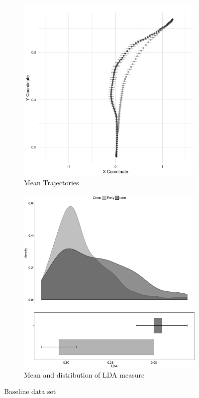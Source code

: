 \documentclass{article}
\begin{document}
\begin{figure}
\centering
\begin{subfigure}[b]{0.45\textwidth}
\includegraphics[width=\textwidth]{TrajectoriesBaseline.png}
\caption{Mean Trajectories}\label{fig:baseline-traj}
\end{subfigure}
\begin{subfigure}[b]{0.45\textwidth}
\includegraphics[width=\textwidth]{lda_distribution_baseline.png}
\caption{Mean and distribution of LDA measure}\label{fig:baseline-lda}
\end{subfigure}
\caption{Baseline data set}
\end{figure}
\end{document}
